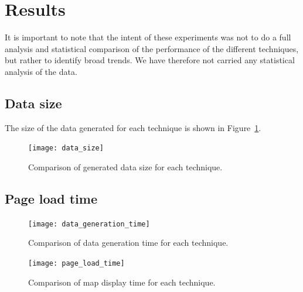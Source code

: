 \documentclass[acmtocl,acmnow]{acmtrans2m}
\begin{document}
\section{Results}
\label{sec-results}

It is important to note that the intent of these experiments was not to
do a full analysis and statistical comparison of the performance of the
different techniques, but rather to identify broad trends. We have
therefore not carried any statistical analysis of the data.



\subsection{Data size}

The size of the data generated for each technique is shown in
Figure~\ref{fig-data-size}.


\begin{figure}
	\begin{center}
		\texttt{[image: data\_size]}
	\end{center}
	\caption{Comparison of generated data size for each technique.}
	\label{fig-data-size}
\end{figure}


\subsection{Page load time}


\begin{figure}
	\begin{center}
		\texttt{[image: data\_generation\_time]}
	\end{center}
	\caption{Comparison of data generation time for each technique.}
	\label{fig-data-generation-time}
\end{figure}


\begin{figure}
	\begin{center}
		\texttt{[image: page\_load\_time]}
	\end{center}
	\caption{Comparison of map display time for each technique.}
	\label{fig-page-load-time}
\end{figure}
\end{document}
